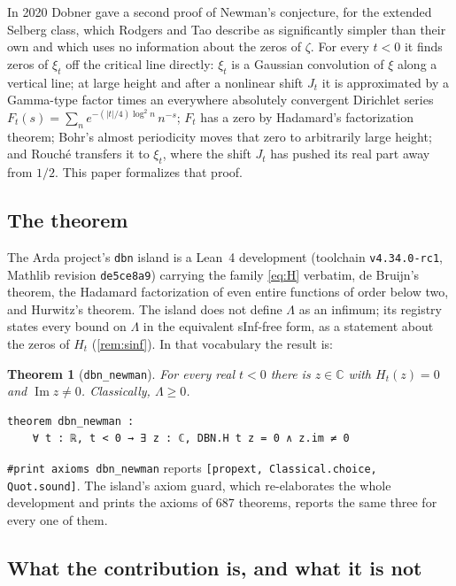 \documentclass[11pt]{article}
\newtheorem{theorem}{Theorem}
\theoremstyle{definition}
\newcommand{\lean}[1]{\texttt{#1}}
\newcommand{\Lam}{\Lambda}
\newcommand{\Hfun}{H}
\newcommand{\im}{\operatorname{Im}}
\newcommand{\C}{\mathbb{C}}
\begin{document}
In 2020 Dobner \cite{Do} gave a second proof of Newman's conjecture, for the extended Selberg class, which Rodgers and Tao describe as significantly simpler than their own and which uses no information about the zeros of $\zeta$. For every $t < 0$ it finds zeros of $\xi_t$ off the critical line directly: $\xi_t$ is a Gaussian convolution of $\xi$ along a vertical line; at large height and after a nonlinear shift $J_t$ it is approximated by a Gamma-type factor times an everywhere absolutely convergent Dirichlet series $F_t(s) = \sum_n e^{-(|t|/4)\log^2 n}\,n^{-s}$; $F_t$ has a zero by Hadamard's factorization theorem; Bohr's almost periodicity moves that zero to arbitrarily large height; and Rouch\'e transfers it to $\xi_t$, where the shift $J_t$ has pushed its real part away from $1/2$. This paper formalizes that proof.

\subsection{The theorem}

The Arda project's \lean{dbn} island \cite{Arda} is a Lean~4 development (toolchain \lean{v4.34.0-rc1}, Mathlib revision \lean{de5ce8a9}) carrying the family \eqref{eq:H} verbatim, de Bruijn's theorem, the Hadamard factorization of even entire functions of order below two, and Hurwitz's theorem. The island does not define $\Lam$ as an infimum; its registry states every bound on $\Lam$ in the equivalent sInf-free form, as a statement about the zeros of $\Hfun_t$ (\cref{rem:sinf}). In that vocabulary the result is:

\begin{theorem}[\lean{dbn\_newman}]\label{thm:main}
For every real $t < 0$ there is $z \in \C$ with $\Hfun_t(z) = 0$ and $\im z \ne 0$. Classically, $\Lam \ge 0$.
\end{theorem}

\begin{lstlisting}
theorem dbn_newman :
    ∀ t : ℝ, t < 0 → ∃ z : ℂ, DBN.H t z = 0 ∧ z.im ≠ 0
\end{lstlisting}

\noindent
\lean{\#print axioms dbn\_newman} reports \lean{[propext, Classical.choice, Quot.sound]}. The island's axiom guard, which re-elaborates the whole development and prints the axioms of 687 theorems, reports the same three for every one of them.

\subsection{What the contribution is, and what it is not}
\end{document}
